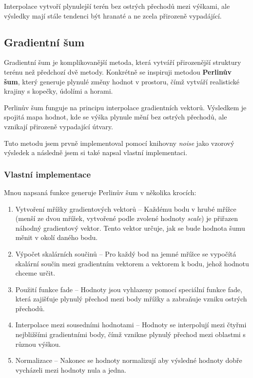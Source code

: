 Interpolace vytvoří plynulejší terén bez ostrých přechodů mezi výškami, ale výsledky mají stále tendenci být hranaté a ne zcela přirozeně vypadájící.

\subsection{Gradientní šum}

Gradientní šum je komplikovanější metoda, která vytváří přirozenější struktury terénu než předchozí dvě metody. Konkrétně se inspiruji metodou \textbf{Perlinův šum}, který generuje plynulé změny hodnot v prostoru, čímž vytváří realistické krajiny s kopečky, údolími a horami.

Perlinův šum funguje na principu interpolace gradientních vektorů. Výsledkem je spojitá mapa hodnot, kde se výška plynule mění bez ostrých přechodů, ale vznikají přirozeně vypadající útvary. 

Tuto metodu jsem prvně implementoval pomocí knihovny \textit{noise} jako vzorový výsledek a následně jsem si také napsal vlastní implementaci.

\subsubsection{Vlastní implementace}

Mnou napsaná funkce generuje Perlinův šum v několika krocích:

\begin{enumerate}
    \item Vytvoření mřížky gradientových vektorů -- Každému bodu v hrubé mřížce (menší ze dvou mřížek, vytvořené podle zvolené hodnoty \textit{scale}) je přiřazen náhodný gradientový vektor. Tento vektor určuje, jak se bude hodnota šumu měnit v okolí daného bodu.
    \item Výpočet skalárních součinů -- Pro každý bod na jemné mřížce se vypočítá skalární součin mezi gradientním vektorem a vektorem k bodu, jehož hodnotu chceme určit.
    \item Použití funkce fade -- Hodnoty jsou vyhlazeny pomocí speciální funkce fade, která zajišťuje plynulý přechod mezi body mřížky a zabraňuje vzniku ostrých přechodů.
    \item Interpolace mezi sousedními hodnotami -- Hodnoty se interpolují mezi čtyřmi nejbližšími gradientními body, čímž vznikne plynulý přechod mezi oblastmi s různou výškou.
    \item Normalizace -- Nakonec se hodnoty normalizují aby výsledné hodnoty dobře vycházeli mezi hodnoty nula a jedna.
\end{enumerate}

